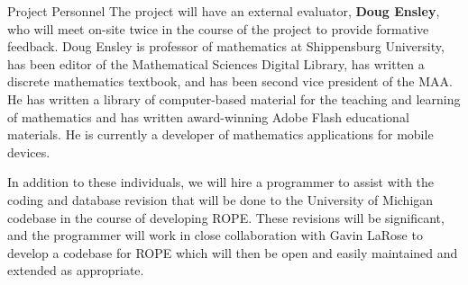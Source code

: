 \documentclass[11pt]{article}
\begin{document}
\begin{section}{Project Personnel}
The project will have an external evaluator, \textbf{Doug Ensley}, who
will meet on-site twice in the course of the project to provide formative
feedback.  Doug Ensley is professor of mathematics at Shippensburg
University, has been editor of the Mathematical Sciences Digital Library,
has written a discrete mathematics textbook, and has been second vice
president of the MAA.  He has written a library of computer-based material
for the teaching and learning of mathematics and has written award-winning
Adobe Flash educational materials.  He is currently a developer of
mathematics applications for mobile devices.

In addition to these individuals, we will hire a programmer to assist with
the coding and database revision that will be done to the University of
Michigan codebase in the course of developing ROPE. These revisions
will be significant, and the programmer will work in close collaboration
with Gavin LaRose to develop a codebase for ROPE which will then be
open and easily maintained and extended as appropriate. 

\end{section}
\end{document}
